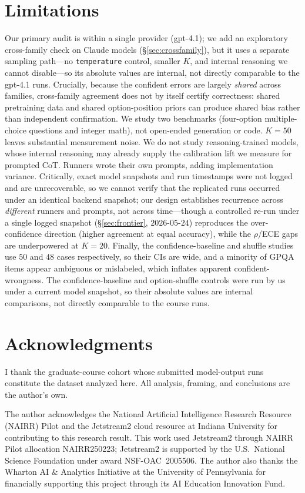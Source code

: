 \documentclass[11pt]{article}
\begin{document}
\section*{Limitations}
\label{sec:limitations}
Our primary audit is within a single provider (gpt-4.1); we add an exploratory cross-family check on
Claude models (\S\ref{sec:crossfamily}), but it uses a separate sampling path---no \texttt{temperature} control,
smaller $K$, and internal reasoning we cannot disable---so its absolute values are internal, not
directly comparable to the gpt-4.1 runs. Crucially, because the confident errors are largely
\emph{shared} across families, cross-family agreement does not by itself certify correctness: shared
pretraining data and shared option-position priors can produce shared bias rather than independent
confirmation. We study two benchmarks (four-option multiple-choice questions and integer math), not open-ended generation or code.
$K{=}50$ leaves substantial measurement noise. We do not study reasoning-trained models, whose internal
reasoning may already supply the calibration lift we measure for prompted CoT. Runners wrote their own
prompts, adding implementation variance. Critically, exact model snapshots and run timestamps were not
logged and are unrecoverable, so we cannot verify that the replicated runs occurred under an identical
backend snapshot; our design establishes recurrence across \emph{different} runners and prompts, not
across time---though a controlled re-run under a single logged snapshot (\S\ref{sec:frontier},
$2026$-$05$-$24$) reproduces the over-confidence direction (higher agreement at equal accuracy), while
the $\rho$/ECE gaps are underpowered at $K{=}20$. Finally, the confidence-baseline and shuffle studies use $50$ and $48$ cases respectively, so their CIs are wide,
and a minority of GPQA items appear ambiguous or mislabeled, which inflates apparent confident-wrongness.
The confidence-baseline and option-shuffle controls were run by us under a current model snapshot, so
their absolute values are internal comparisons, not directly comparable to the course runs.

\section*{Acknowledgments}
I thank the graduate-course cohort whose submitted model-output runs constitute the dataset analyzed
here. All analysis, framing, and conclusions are the author's own.

The author acknowledges the National Artificial Intelligence Research Resource (NAIRR) Pilot and the
Jetstream2 cloud resource at Indiana University for contributing to this research result. This work
used Jetstream2 through NAIRR Pilot allocation NAIRR250223; Jetstream2 is supported by the U.S.\
National Science Foundation under award NSF-OAC~2005506. The author also thanks the Wharton AI \&
Analytics Initiative at the University of Pennsylvania for financially supporting this project through
its AI Education Innovation Fund.
\end{document}
